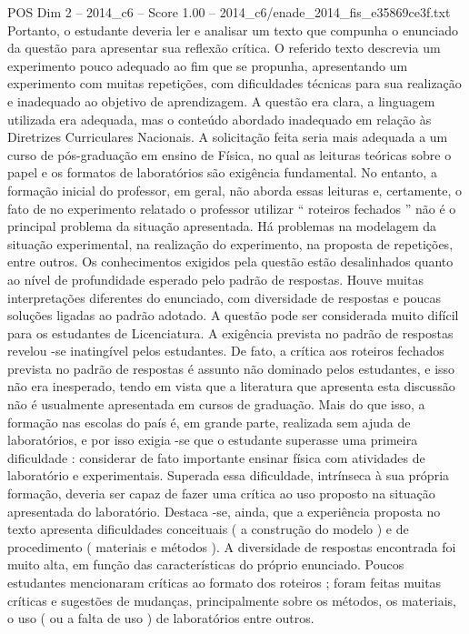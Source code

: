 \begin{textsample}{POS Dim 2 – 2014\_c6 – Score 1.00 – 2014\_c6/enade\_2014\_fis\_e35869ce3f.txt}
Portanto, o estudante deveria ler e analisar um texto que compunha o enunciado da questão para apresentar sua reflexão crítica.
O referido texto descrevia um experimento pouco adequado ao fim que se propunha, apresentando um experimento com muitas repetições, com dificuldades técnicas para sua realização e inadequado ao objetivo de aprendizagem.
A questão era clara, a linguagem utilizada era adequada, mas o conteúdo abordado inadequado em relação às Diretrizes Curriculares Nacionais.
A solicitação feita seria mais adequada a um curso de pós-graduação em ensino de Física, no qual as leituras teóricas sobre o papel e os formatos de laboratórios são exigência fundamental.
No entanto, a formação inicial do professor, em geral, não aborda essas leituras e, certamente, o fato de no experimento relatado o professor utilizar “ roteiros fechados ” não é o principal problema da situação apresentada.
Há problemas na modelagem da situação experimental, na realização do experimento, na proposta de repetições, entre outros.
Os conhecimentos exigidos pela questão estão desalinhados quanto ao nível de profundidade esperado pelo padrão de respostas.
Houve muitas interpretações diferentes do enunciado, com diversidade de respostas e poucas soluções ligadas ao padrão adotado.
A questão pode ser considerada muito difícil para os estudantes de Licenciatura.
A exigência prevista no padrão de respostas revelou -se inatingível pelos estudantes.
De fato, a crítica aos roteiros fechados prevista no padrão de respostas é assunto não dominado pelos estudantes, e isso não era inesperado, tendo em vista que a literatura que apresenta esta discussão não é usualmente apresentada em cursos de graduação.
Mais do que isso, a formação nas escolas do país é, em grande parte, realizada sem ajuda de laboratórios, e por isso exigia -se que o estudante superasse uma primeira dificuldade : considerar de fato importante ensinar física com atividades de laboratório e experimentais.
Superada essa dificuldade, intrínseca à sua própria formação, deveria ser capaz de fazer uma crítica ao uso proposto na situação apresentada do laboratório.
Destaca -se, ainda, que a experiência proposta no texto apresenta dificuldades conceituais ( a construção do modelo ) e de procedimento ( materiais e métodos ).
A diversidade de respostas encontrada foi muito alta, em função das características do próprio enunciado.
Poucos estudantes mencionaram críticas ao formato dos roteiros ; foram feitas muitas críticas e sugestões de mudanças, principalmente sobre os métodos, os materiais, o uso ( ou a falta de uso ) de laboratórios entre outros.

\end{textsample}
